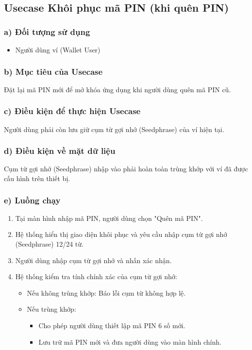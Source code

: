\documentclass[a4paper]{report}
\begin{document}
\subsection{Usecase Khôi phục mã PIN (khi quên PIN)}

\subsubsection{a) Đối tượng sử dụng}
\begin{itemize}
    \item Người dùng ví (Wallet User)
\end{itemize}

\subsubsection{b) Mục tiêu của Usecase}
Đặt lại mã PIN mới để mở khóa ứng dụng khi người dùng quên mã PIN cũ.

\subsubsection{c) Điều kiện để thực hiện Usecase}
Người dùng phải còn lưu giữ cụm từ gợi nhớ (Seedphrase) của ví hiện tại.

\subsubsection{d) Điều kiện về mặt dữ liệu}
Cụm từ gợi nhớ (Seedphrase) nhập vào phải hoàn toàn trùng khớp với ví đã được cấu hình trên thiết bị.

\subsubsection{e) Luồng chạy}
\begin{enumerate}
    \item Tại màn hình nhập mã PIN, người dùng chọn "Quên mã PIN".
    \item Hệ thống hiển thị giao diện khôi phục và yêu cầu nhập cụm từ gợi nhớ (Seedphrase) 12/24 từ.
    \item Người dùng nhập cụm từ gợi nhớ và nhấn xác nhận.
    \item Hệ thống kiểm tra tính chính xác của cụm từ gợi nhớ:
    \begin{itemize}
        \item Nếu không trùng khớp: Báo lỗi cụm từ không hợp lệ.
        \item Nếu trùng khớp:
        \begin{itemize}
            \item Cho phép người dùng thiết lập mã PIN 6 số mới.
            \item Lưu trữ mã PIN mới và đưa người dùng vào màn hình chính.
        \end{itemize}
    \end{itemize}
\end{enumerate}
\end{document}
